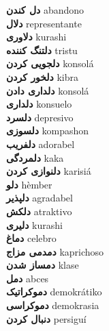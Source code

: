 \textbf{ دل کندن  } abandono \\
\textbf{ دلال  } representante \\
\textbf{ دلاوری  } kurashi \\
\textbf{ دلتنگ کننده  } tristu \\
\textbf{ دلجویی کردن  } konsolá \\
\textbf{ دلخور کردن  } kibra \\
\textbf{ دلداری دادن  } konsolá \\
\textbf{ دلداری  } konsuelo \\
\textbf{ دلسرد  } depresivo \\
\textbf{ دلسوزی  } kompashon \\
\textbf{ دلفریب  } adorabel \\
\textbf{ دلمردگی  } kaka \\
\textbf{ دلنوازی کردن  } karisiá \\
\textbf{ دلو  } hèmber \\
\textbf{ دلپذیر  } agradabel \\
\textbf{ دلکش  } atraktivo \\
\textbf{ دلیری  } kurashi \\
\textbf{ دماغ  } celebro \\
\textbf{ دمدمی مزاج  } kaprichoso \\
\textbf{ دمساز شدن  } klase \\
\textbf{ دمل  } abces \\
\textbf{ دموکراتیک  } demokrátiko \\
\textbf{ دموکراسی  } demokrasia \\
\textbf{ دنبال کردن  } persiguí \\
